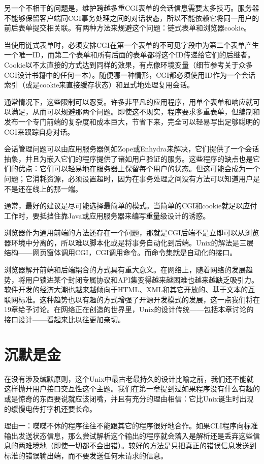 \documentclass[12pt,oneside]{book}
\begin{document}
\begin{common-format}
另一个不相干的问题是，维护跨越多重CGI表单的会话信息需要太多技巧。服务器不能够保留客户端同CGI事务处理之间的对话状态，所以不能依赖它将同一用户的前后表单提交相关联。有两种方法来规避这个问题：链式表单和浏览器cookie。

当使用链式表单时，必须安排CGI在第一个表单的不可见字段中为第二个表单产生一个唯一ID，而第二个表单和所有后面的表单都将这个ID传递给它们的后继者。Cookie以不太直接的方式达到同样的效果，有点像环境变量（细节参考关于众多CGI设计书籍中的任何一本）。随便哪一种情形，CGI都必须使用ID作为一个会话索引（或是cookie来直接缓存状态）和显式地处理复用会话。

通常情况下，这些限制可以忍受。许多非平凡的应用程序，用单个表单和响应就可以满足，从而可以规避那两个问题。即使这不现实，程序要求多重表单，但编制和发布一个专门前端的复杂度和成本巨大，节省下来，完全可以轻易写出足够聪明的CGI来跟踪自身对话。

会话管理问题可以由应用服务器例如Zope或Enhydra来解决，它们提供了一个会话抽象，并且为嵌入它们的程序提供了诸如用户验证的服务。这些程序的缺点也是它们的优点：它们可以轻易地在服务器上保留每个用户的状态。但这可能会成为一个问题；它消耗资源，必须设置超时，因为在事务处理之间没有方法可以知道用户是不是还在线上的那一端。

通常，最好的建议是尽可能选择最简单的模式。当简单的CGI和cookie就足以应付工作时，要抵挡住靠Java或应用服务器来编写重量级设计的诱惑。

浏览器作为通用前端的方法还存在一个问题，那就是CGI后端不是立即可以从浏览器环境中分离的，所以难以脚本化或是将事务自动化到后端。Unix的解法是三层结构——网页窗体调用CGI，CGI调用命令。而命令集就是自动化的接口。

浏览器解开前端和后端耦合的方式具有重大意义。在网络上，随着网络的发展趋势，将用户锁进某个封闭专属协议和API集变得越来越困难也越来越缺乏吸引力。软件开发的经济大潮也越来越倾向于HTML、XML和其它开放的、基于文本的互联网标准。这种趋势也以有趣的方式增强了开源开发模式的发展，这一点我们将在19章给予讨论。在网络正在创造的世界里，Unix的设计传统——包括本章讨论的接口设计——看起来比以往更加亲切。

\section{沉默是金}
在没有涉及缄默原则，这个Unix中最古老最持久的设计比喻之前，我们还不能就这样抛开用户接口交互性这个主题。我们在第一章提到过如果程序没有什么有趣的或是惊奇的东西要说就应该闭嘴，并且有充分的理由相信：它比Unix诞生时出现的缓慢电传打字机还要长命。

理由一：喋喋不休的程序往往不能跟其它的程序很好地合作。如果CLI程序向标准输出发送状态信息，那么尝试解析这个输出的程序就会落入是解析还是丢弃这些信息的两难境地（即使一切都不会出错）。较好的方法是只把真正的错误信息发送到标淮的错误输出端，而不要发送任何未请求的信息。


\end{common-format}
\end{document}
